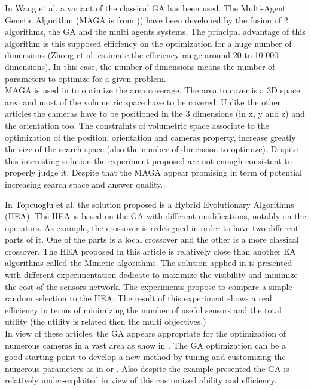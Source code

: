 In Wang et al. \cite{152*wang2009} a variant of the classical GA has been used. The Multi-Agent Genetic Algorithm (MAGA is from \cite{223*zhong2004})) have been developed by the fusion of 2 algorithms, the GA and the multi agents systems. The principal advantage of this algorithm is this supposed efficiency on the optimization for a huge number of dimensions (Zhong et al. estimate the efficiency range around 20 to 10 000 dimensions). In this case, the number of dimensions means the number of parameters to optimize for a given problem.\\
MAGA is used in \cite{152*wang2009} to optimize the area coverage. The area to cover is a 3D space area and most of the volumetric space have to be covered.  Unlike the other articles the cameras have to be positioned in the 3 dimensions (in x, y and z) and the orientation too. The constraints of volumetric space associate to the optimization of the position, orientation and cameras property, increase greatly the size of the search space (also  the number of dimension to optimize).  
Despite this interesting solution the experiment proposed are not enough consistent to properly judge it. Despite that the MAGA appear promising in term of  potential increasing search space and answer quality. 

In Topcuoglu et al. \cite{101*topcuoglu2009} the solution proposed is a Hybrid Evolutionary Algorithms (HEA).  The HEA is based on the GA with different modifications, notably on the operators. As example, the crossover is redesigned in order to have two different parts of it. 
One of the parts is a local crossover and the other is a more classical crossover.  
The HEA proposed in this article is relatively close than another EA algorithms called the Mimetic algorithms. 
The solution applied in \cite{101*topcuoglu2009} is  presented with different experimentation dedicate  to maximize the visibility and minimize the cost of the sensors network. The experiments propose to compare a simple random selection to the HEA. The result of this experiment shows a real efficiency in terms of minimizing the number of useful sensors and the total utility (the utility is related then the multi objectives.) \\

In view of these articles, the GA appears appropriate for the optimization of numerous cameras in  a vast area as show in \cite{165*jiang2010}. The GA optimization can be a good starting point to develop a new method by tuning and customizing the numerous parameters as in \cite{101*topcuoglu2009,152*wang2009}  or \cite{83*van2009}. Also despite the example presented  the GA is relatively under-exploited in view of this customized ability and efficiency.


